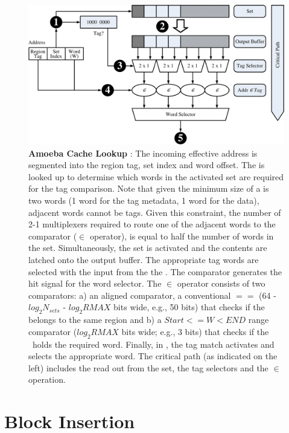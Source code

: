 \begin{figure}[h]
  \includegraphics[width=\textwidth]{files/Figures/06-Lookup.pdf}
  \caption[Amoeba Cache Lookup]{\textbf{Amoeba Cache Lookup} : The incoming effective address is segmented into the region tag, set index and word offset.  The  is looked up to determine which words in the activated set are required for the tag comparison. Note that given the minimum size of a \AB{} is two words (1 word for the tag metadata, 1 word for the data), adjacent words cannot be tags. Given this constraint, 
  the number of 2-1 multiplexers required to route one of the adjacent words to the comparator ($\in$ operator), is equal to half the number of words in the set.  Simultaneously, the set is activated and the contents are latched onto the output buffer.  The appropriate tag words are selected with the input from the the .  The comparator generates the hit signal for the word selector. The $\in$ operator consists of two comparators: a) an aligned  comparator, a conventional $==$ (64 - $log_2N_{sets}$ - $log_2{RMAX}$ bits wide, e.g., 50 bits) that checks if the \AB{} belongs to the same region and b) a $ Start <= W < END $ range comparator ($log_2RMAX$ bits wide; e.g., 3 bits) that checks if the \AB\ holds the required word. Finally, in , the tag match activates and selects the appropriate word. The critical path (as indicated on the left) includes the read out from the set, the tag selectors and the $\in$ operation.}
  \label{fig:ac_lookup}
\end{figure}

\clearpage

\section{Block Insertion}

